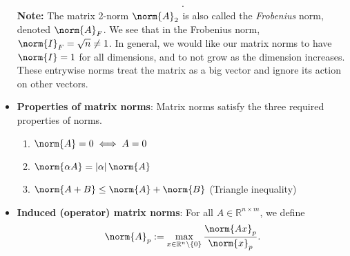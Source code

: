 \documentclass{report}
\begin{document}
\begin{itemize}
\begin{align*}
            .\end{align*}
            \textbf{Note:} The matrix 2-norm $\norm{A}_{2}$ is also called the \textit{Frobenius} norm, denoted $\norm{A}_{F}$.
            \bigbreak \noindent 
            We see that in the Frobenius norm, $\norm{I}_{F} = \sqrt{n} \ne 1$. In general, we would like our matrix norms to have $\norm{I} = 1$ for all dimensions, and to not grow as the dimension increases.
            \bigbreak \noindent 
            These entrywise norms treat the matrix as a big vector and ignore its action on other vectors.
        \item \textbf{Properties of matrix norms}: Matrix norms satisfy the three required properties of norms.
            \begin{enumerate}
                \item $\norm{A} = 0 \iff A = 0 $
                \item $\norm{\alpha A} = \left\lvert \alpha \right\rvert \norm{A} $
                \item $\norm{A + B} \leq \norm{A} + \norm{B} $ (Triangle inequality)
            \end{enumerate}
        \item \textbf{Induced (operator) matrix norms}: For all $A\in \mathbb{R}^{n\times m}$, we define
            \begin{align*}
                \norm{A}_{p} := \max_{x\in\mathbb{R}^{n} \setminus \{0\}} \frac{\norm{Ax}_{p}}{\norm{x}_{p}}
            .\end{align*}


\end{itemize}
\end{document}
